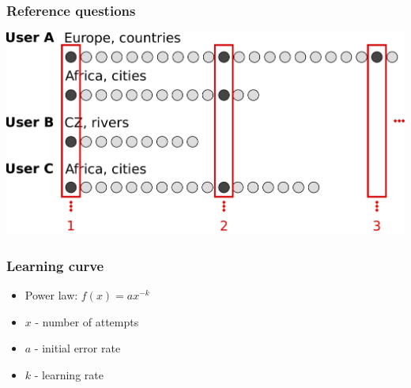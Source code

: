 \documentclass[bigger]{beamer}
\begin{document}
\begin{frame}
  \frametitle{Reference questions}
  \includegraphics[width=\textwidth]{img/reference_answers_learning}
\end{frame}


\begin{frame}
  \frametitle{Learning curve}
	\begin{itemize}
		\item Power law: $f(x)=ax^{-k}$
		\item $x$ - number of attempts
    \item $a$ - initial error rate
    \item $k$ - learning rate
	\end{itemize}
\end{frame}
\end{document}
